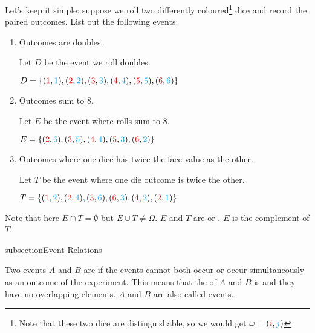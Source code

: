 \begin{example}
    Let's keep it simple: suppose we roll two differently coloured\footnote{Note that these two dice are distinguishable, so we would get $\omega = ({\color{red} i}, {\color{lightBlue} j})$} dice and record the paired outcomes. List out the following events:

    \begin{enumerate}[label=\alph*)]
        \item Outcomes are doubles. 

        Let $D$ be the event we roll doubles. 

        $D = \{ ({\color{red} 1}, {\color{lightBlue} 1}), ({\color{red} 2}, {\color{lightBlue} 2}), ({\color{red} 3}, {\color{lightBlue} 3}), ({\color{red} 4}, {\color{lightBlue} 4}), ({\color{red} 5}, {\color{lightBlue} 5}), ({\color{red} 6}, {\color{lightBlue} 6}) \}$

        \item Outcomes sum to $8$. 

        Let $E$ be the event where rolls sum to $8$. 

        $E = \{ ({\color{red} 2}, {\color{lightBlue} 6}), ({\color{red} 3}, {\color{lightBlue} 5}), ({\color{red} 4}, {\color{lightBlue} 4}), ({\color{red} 5}, {\color{lightBlue} 3}), ({\color{red} 6}, {\color{lightBlue} 2}) \}$

        \item Outcomes where one dice has twice the face value as the other. 

        Let $T$ be the event where one die outcome is twice the other. 

        $T = \{ ({\color{red} 1}, {\color{lightBlue} 2}), ({\color{red} 2}, {\color{lightBlue} 4}), ({\color{red} 3}, {\color{lightBlue} 6}), ({\color{red} 6}, {\color{lightBlue} 3}), ({\color{red} 4}, {\color{lightBlue} 2}), ({\color{red} 2}, {\color{lightBlue} 1}) \}$
    \end{enumerate}

    Note that here $E \cap T = \emptyset$ but $E \cup T \neq \Omega$. $E$ and $T$ are  or . $E$ is  the complement of $T$. 
\end{example}

subsection{Event Relations}

\begin{definition}
    Two events $A$ and $B$ are  if the events cannot both occur or occur simultaneously as an outcome of the experiment. This means that the  of $A$ and $B$ is  and they have no overlapping elements. $A$ and $B$ are also called  events. 
\end{definition}

